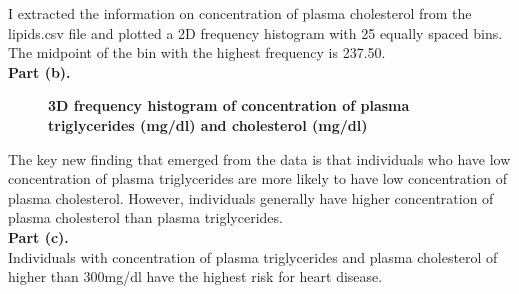 \documentclass[letterpaper,12pt]{article}
\theoremstyle{definition}
\begin{document}
\flushleft I extracted the information on concentration of plasma cholesterol from the lipids.csv file and plotted a 2D frequency histogram with 25 equally spaced bins. The midpoint of the bin with the highest frequency is 237.50. \\
\newpage
\textbf{Part (b).} \\
\begin{figure}[htb]\centering\captionsetup{width=4.0in}
  \caption{\textbf{3D frequency histogram of concentration of plasma triglycerides (mg/dl) and cholesterol (mg/dl)}}\label{FigExample}
\end{figure}
\flushleft The key new finding that emerged from the data is that individuals who have low concentration of plasma triglycerides are more likely to have low concentration of plasma cholesterol. However, individuals generally have higher concentration of plasma cholesterol than plasma triglycerides. \\

\textbf{Part (c).} \\
\flushleft Individuals with concentration of plasma triglycerides and plasma cholesterol of higher than 300mg/dl have the highest risk for heart disease.\\
\end{document}
